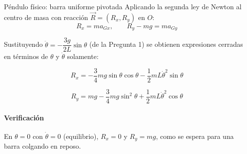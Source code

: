 \begin{solucion}{Péndulo físico: barra uniforme pivotada}
Aplicando la segunda ley de Newton al centro de masa con reacción $\vec{R} = (R_x, R_y)$ en $O$:
$$R_x = ma_{Gx}, \qquad R_y - mg = ma_{Gy}$$

Sustituyendo $\ddot{\theta} = -\dfrac{3g}{2L}\sin\theta$ (de la Pregunta 1) se obtienen expresiones cerradas en términos de $\theta$ y $\dot\theta$ solamente:

$$\boxed{R_x = -\frac{3}{4}mg\sin\theta\cos\theta - \frac{1}{2}mL\dot{\theta}^2\sin\theta}$$

$$\boxed{R_y = mg - \frac{3}{4}mg\sin^2\theta + \frac{1}{2}mL\dot{\theta}^2\cos\theta}$$

\paragraph{Verificación} En $\theta = 0$ con $\dot\theta = 0$ (equilibrio), $R_x = 0$ y $R_y = mg$, como se espera para una barra colgando en reposo.
\end{solucion}
